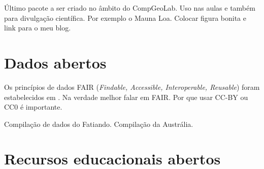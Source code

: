 \documentclass[10pt,a4paper,oneside]{book}
\begin{document}
Último pacote a ser criado no âmbito do CompGeoLab.
Uso nas aulas e também para divulgação científica.
Por exemplo o Mauna Loa.
Colocar figura bonita e link para o meu blog.


\section{Dados abertos}

Os princípios de dados FAIR (\textit{Findable, Accessible, Interoperable,
Reusable}) foram estabelecidos em \citet{Wilkinson2016}.
Na verdade melhor falar em FAIR.
Por que usar CC-BY ou CC0 é importante.

Compilação de dados do Fatiando.
Compilação da Austrália.


\section{Recursos educacionais abertos}
\end{document}
